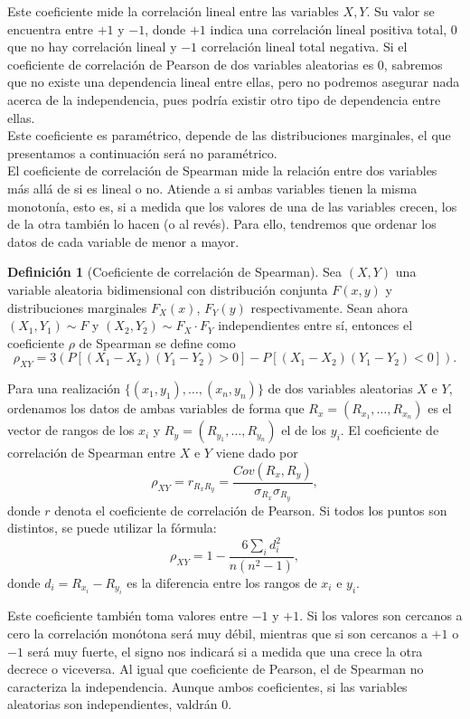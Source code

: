 \documentclass[12pt,a4paper]{report} %
\theoremstyle{definition}
\newtheorem{definition}{Definición}[section]
\begin{document}
Este coeficiente mide la correlación lineal entre las variables $X,Y$. Su valor se encuentra entre $+1$ y $-1$, donde $+1$ indica una correlación lineal positiva total, $0$ que no hay correlación lineal y $-1$ correlación lineal total negativa. Si el coeficiente de correlación de Pearson de dos variables aleatorias es $0$, sabremos que no existe una dependencia lineal entre ellas, pero no podremos asegurar nada acerca de la independencia, pues podría existir otro tipo de dependencia entre ellas.\\

Este coeficiente es paramétrico, depende de las distribuciones marginales, el que presentamos a continuación será no paramétrico.\\

El coeficiente de correlación de Spearman mide la relación entre dos variables más allá de si es lineal o no. Atiende a si ambas variables tienen la misma monotonía, esto es, si a medida que los valores de una de las variables crecen, los de la otra también lo hacen (o al revés). Para ello, tendremos que ordenar los datos de cada variable de menor a mayor.\\


\begin{definition}[Coeficiente de correlación de Spearman]
  Sea $(X,Y)$ una variable aleatoria bidimensional con distribución conjunta $F(x,y)$ y distribuciones marginales $F_X(x)$, $F_Y(y)$ respectivamente. Sean ahora $(X_1,Y_1)\sim F$ y $(X_2,Y_2)\sim F_X \cdot F_Y$ independientes entre sí, entonces el coeficiente $\rho$ de Spearman se define como\[
\rho_{XY} = 3\left ( P\left[(X_1-X_2)(Y_1-Y_2) > 0\right] -  P\left[(X_1-X_2)(Y_1-Y_2) < 0\right]\right).
  \]
  
  Para una realización $\{(x_1,y_1),\dots,(x_n,y_n)\}$ de dos variables aleatorias $X$ e $Y$, ordenamos los datos de ambas variables de forma que $R_x = (R_{x_1},\dots,R_{x_n})$ es el vector de rangos de los $x_i$ y $R_y = (R_{y_1},\dots,R_{y_n})$ el de los $y_i$. El coeficiente de correlación de Spearman entre $X$ e $Y$ viene dado por\[
\rho_{XY}=r_{R_xR_y}=\frac{Cov(R_x,R_y)}{\sigma_{R_x}\sigma_{R_y}},
\] donde $r$ denota el coeficiente de correlación de Pearson. Si todos los puntos son distintos, se puede utilizar la fórmula:\[
\rho_{XY} = 1 - \frac{6\sum_i d_i^2}{n(n^2-1)},
\]donde $d_i = R_{x_i}-R_{y_i}$ es la diferencia entre los rangos de $x_i$ e $y_i$.\\
\end{definition}

Este coeficiente también toma valores entre $-1$ y $+1$. Si los valores son cercanos a cero la correlación monótona será muy débil, mientras que si son cercanos a $+1$ o $-1$ será muy fuerte, el signo nos indicará si a medida que una crece la otra decrece o viceversa. Al igual que coeficiente de Pearson, el de Spearman no caracteriza la independencia. Aunque ambos coeficientes, si las variables aleatorias son independientes, valdrán $0$.\\
\end{document}
